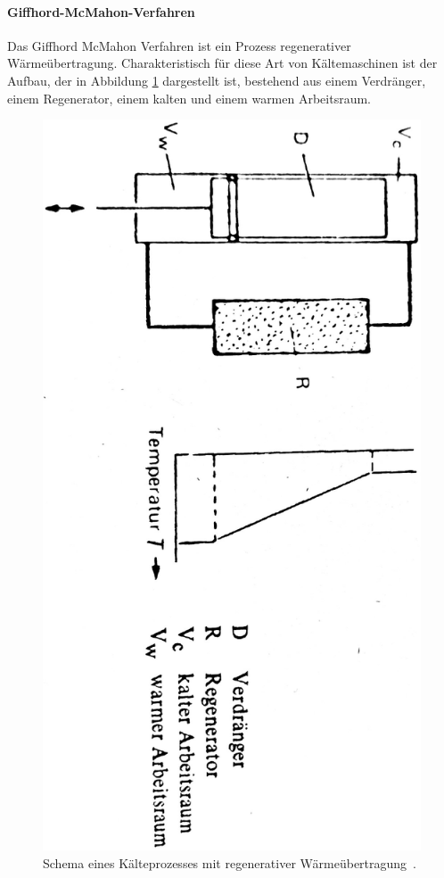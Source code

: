 \documentclass[parskip=half, a4paper,twoside,final]{article}
\begin{document}
\paragraph{Giffhord-McMahon-Verfahren}
Das Giffhord McMahon Verfahren ist ein Prozess regenerativer Wärmeübertragung. Charakteristisch für diese Art von Kältemaschinen ist der Aufbau, der in Abbildung \ref{fig:Kältemaschine} dargestellt ist, bestehend aus einem Verdränger, einem Regenerator, einem kalten und einem warmen Arbeitsraum.

\begin{figure}[htp]
    \centering
        \includegraphics[height=0.9\textwidth, angle=90]{Bilder/Kalteprozess regenerativer Wärmeübertragung.pdf}
    \caption{Schema eines Kälteprozesses mit regenerativer Wärmeübertragung~\cite{Frey}.}
    \label{fig:Kältemaschine}
\end{figure}
\end{document}

